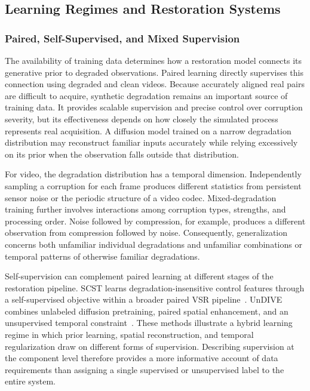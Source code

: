 \subsection{Learning Regimes and Restoration Systems}
\label{sec:learning}
\subsubsection{Paired, Self-Supervised, and Mixed Supervision}
The availability of training data determines how a restoration model connects its generative prior to degraded observations. Paired learning directly supervises this connection using degraded and clean videos. Because accurately aligned real pairs are difficult to acquire, synthetic degradation remains an important source of training data. It provides scalable supervision and precise control over corruption severity, but its effectiveness depends on how closely the simulated process represents real acquisition. A diffusion model trained on a narrow degradation distribution may reconstruct familiar inputs accurately while relying excessively on its prior when the observation falls outside that distribution.

For video, the degradation distribution has a temporal dimension. Independently sampling a corruption for each frame produces different statistics from persistent sensor noise or the periodic structure of a video codec. Mixed-degradation training further involves interactions among corruption types, strengths, and processing order. Noise followed by compression, for example, produces a different observation from compression followed by noise. Consequently, generalization concerns both unfamiliar individual degradations and unfamiliar combinations or temporal patterns of otherwise familiar degradations.

Self-supervision can complement paired learning at different stages of the restoration pipeline. SCST learns degradation-insensitive control features through a self-supervised objective within a broader paired VSR pipeline~\cite{scst}. UnDIVE combines unlabeled diffusion pretraining, paired spatial enhancement, and an unsupervised temporal constraint~\cite{undive}. These methods illustrate a hybrid learning regime in which prior learning, spatial reconstruction, and temporal regularization draw on different forms of supervision. Describing supervision at the component level therefore provides a more informative account of data requirements than assigning a single supervised or unsupervised label to the entire system.

